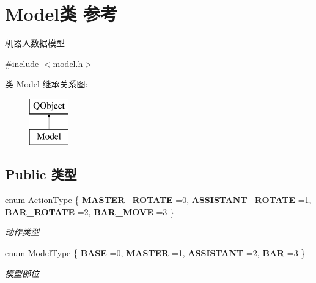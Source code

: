 \hypertarget{class_model}{}\section{Model类 参考}
\label{class_model}


机器人数据模型  




{\ttfamily \#include $<$model.\+h$>$}

类 Model 继承关系图\+:\begin{figure}[H]
\begin{center}
\leavevmode
\includegraphics[height=2.000000cm]{class_model}
\end{center}
\end{figure}
\subsection*{Public 类型}
\begin{DoxyCompactItemize}
\item 
\hypertarget{class_model_a639d17254535dbda93359bed8722e6c7}{}enum \hyperlink{class_model_a639d17254535dbda93359bed8722e6c7}{Action\+Type} \{ {\bfseries M\+A\+S\+T\+E\+R\+\_\+\+R\+O\+T\+A\+T\+E} =0, 
{\bfseries A\+S\+S\+I\+S\+T\+A\+N\+T\+\_\+\+R\+O\+T\+A\+T\+E} =1, 
{\bfseries B\+A\+R\+\_\+\+R\+O\+T\+A\+T\+E} =2, 
{\bfseries B\+A\+R\+\_\+\+M\+O\+V\+E} =3
 \}\label{class_model_a639d17254535dbda93359bed8722e6c7}

\begin{DoxyCompactList}\small\item\em 动作类型 \end{DoxyCompactList}\item 
\hypertarget{class_model_a997cd2b5b12b228bfbcdc1829e75352b}{}enum \hyperlink{class_model_a997cd2b5b12b228bfbcdc1829e75352b}{Model\+Type} \{ {\bfseries B\+A\+S\+E} =0, 
{\bfseries M\+A\+S\+T\+E\+R} =1, 
{\bfseries A\+S\+S\+I\+S\+T\+A\+N\+T} =2, 
{\bfseries B\+A\+R} =3
 \}\label{class_model_a997cd2b5b12b228bfbcdc1829e75352b}

\begin{DoxyCompactList}\small\item\em 模型部位 \end{DoxyCompactList}\end{DoxyCompactItemize}
